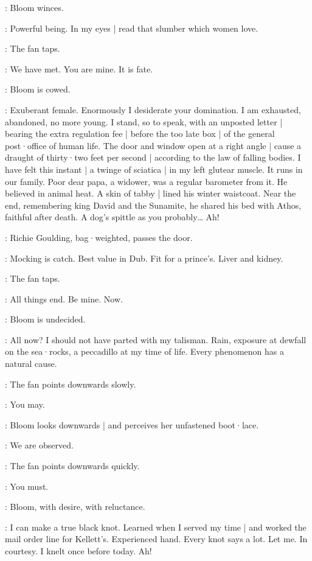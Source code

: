:
Bloom winces.

\Bloom:
Powerful being.
In my eyes |
read that slumber which women love.

:
The fan taps.

\Fan:
We have met.
You are mine.
It is fate.

:
Bloom is cowed.

\Bloom:
Exuberant female.
Enormously I desiderate your domination.
I am exhausted,
abandoned,
no more young.
I stand,
so to speak,
with an unposted letter |
bearing the extra regulation fee |
before the too late box |
of the general post·office of human life.
%
The door and window open at a right angle |
cause a draught of thirty·two feet per second |
according to the law of falling bodies.
I have felt this instant |
a twinge of sciatica |
in my left glutear muscle.
It runs in our family.
Poor dear papa,
a widower,
was a regular barometer from it.
He believed in animal heat.
A skin of tabby |
lined his winter waistcoat.
Near the end,
remembering king David and the Sunamite,
he shared his bed with Athos,
faithful after death.
A dog's spittle as you probably…
Ah!

:
Richie Goulding,
bag·weighted,
passes the door.

\Richie:
Mocking is catch.
Best value in Dub.
Fit for a prince's.
%
Liver and kidney.

:
The fan taps.

\Fan:
All things end.
Be mine.
Now.

:
Bloom is undecided.

\Bloom:
All now?
I should not have parted with my talisman.
Rain,
exposure at dewfall on the sea·rocks,
a peccadillo at my time of life.
Every phenomenon has a natural cause.

:
The fan points downwards slowly.

\Fan:
You may.

:
Bloom looks downwards |
and perceives her unfastened boot·lace.

\Bloom:
We are observed.

:
The fan points downwards quickly.

\Fan:
You must.

:
Bloom,
with desire,
with reluctance.

\Bloom:
I can make a true black knot.
Learned when I served my time |
and worked the mail order line for Kellett's.
Experienced hand.
Every knot says a lot.
Let me.
In courtesy.
I knelt once before today.
Ah!

